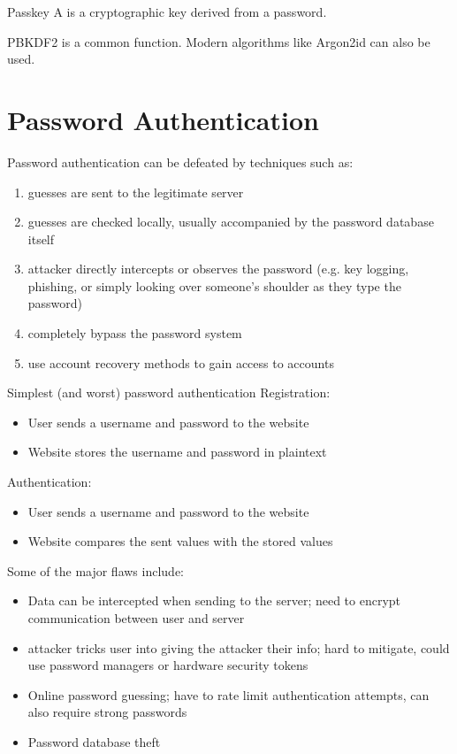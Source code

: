\documentclass[code]{amznotes}
\begin{document}
\begin{dfnbox}{Passkey}{}
    A  is a cryptographic key derived from a password.
\end{dfnbox}

PBKDF2 is a common function. Modern algorithms like Argon2id can also be used.

\section{Password Authentication}

Password authentication can be defeated by techniques such as:
\begin{enumerate}[noitemsep]
    \item {} guesses are sent to the legitimate server
    \item {} guesses are checked locally, usually accompanied by the password database itself
    \item {} attacker directly intercepts or observes the password (e.g. key logging, phishing, or simply looking over someone's shoulder as they type the password)
    \item {} completely bypass the password system
    \item {} use account recovery methods to gain access to accounts
\end{enumerate}

\begin{exbox}{Simplest (and worst) password authentication}{}
    Registration:
    \begin{itemize}[noitemsep]
        \item User sends a username and password to the website
        \item Website stores the username and password in plaintext
    \end{itemize}
    Authentication:
    \begin{itemize}[noitemsep]
        \item User sends a username and password to the website
        \item Website compares the sent values with the stored values
    \end{itemize}
\end{exbox}

Some of the major flaws include:
\begin{itemize}[noitemsep]
    \item Data can be intercepted when sending to the server; need to encrypt communication between user and server
    \item {} attacker tricks user into giving the attacker their info; hard to mitigate, could use password managers or hardware security tokens
    \item Online password guessing; have to rate limit authentication attempts, can also require strong passwords
    \item Password database theft
\end{itemize}
\end{document}
